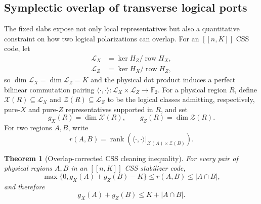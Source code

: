 \documentclass[aps,prx,reprint,superscriptaddress,nofootinbib,floatfix,longbibliography]{revtex4-2}
\newtheorem{theorem}{Theorem}[section]
\theoremstyle{definition}
\DeclareMathOperator{\rank}{rank}
\begin{document}
\subsection{Symplectic overlap of transverse logical ports}
\label{sec:symplectic-overlap}
The fixed slabs expose not only local representatives but also a quantitative
constraint on how two logical polarizations can overlap.  For an $[[n,K]]$
CSS code, let
\begin{align}
 \mathcal L_X&=\ker H_Z/\operatorname{row}H_X,\\
 \mathcal L_Z&=\ker H_X/\operatorname{row}H_Z,
\end{align}
so $\dim\mathcal L_X=\dim\mathcal L_Z=K$ and the physical dot product induces
a perfect bilinear commutation pairing
$\langle\cdot,\cdot\rangle:\mathcal L_X\times\mathcal L_Z\to\mathbb F_2$.
For a physical region $R$, define $\mathcal X(R)\subseteq\mathcal L_X$ and
$\mathcal Z(R)\subseteq\mathcal L_Z$ to be the logical classes admitting,
respectively, pure-$X$ and pure-$Z$ representatives supported in $R$, and set
\begin{equation}
 g_X(R)=\dim\mathcal X(R),\qquad g_Z(R)=\dim\mathcal Z(R).
 \label{eq:gxgz-def}
\end{equation}
For two regions $A,B$, write
\begin{equation}
 r(A,B)=\rank\!\left(\langle\cdot,\cdot\rangle
 \big|_{\mathcal X(A)\times\mathcal Z(B)}\right).
 \label{eq:overlap-rank-def}
\end{equation}

\begin{theorem}[Overlap-corrected CSS cleaning inequality]
\label{thm:overlap-cleaning}
For every pair of physical regions $A,B$ in an $[[n,K]]$ CSS stabilizer code,
\begin{equation}
 \max\{0,g_X(A)+g_Z(B)-K\}\le r(A,B)\le |A\cap B|,
 \label{eq:overlap-rank-sandwich}
\end{equation}
and therefore
\begin{equation}
 g_X(A)+g_Z(B)\le K+|A\cap B|.
 \label{eq:overlap-cleaning}
\end{equation}
\end{theorem}
\end{document}
